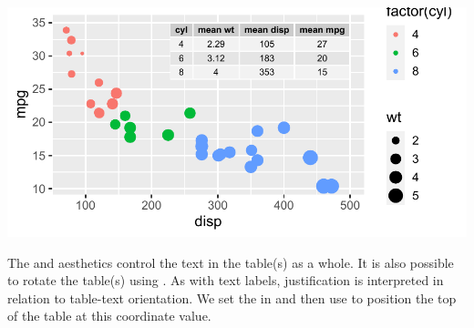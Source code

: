 \documentclass[krantz2]{krantz}\usepackage{knitr}
\begin{document}
\begin{knitrout}\footnotesize
{}\color{fgcolor}\begin{kframe}
\begin{alltt}
\hlstd{(}  \hlstd{(}   
                           \hlstd{=} 
                           
                            \hlopt{+}
  \hlstd{()} \hlopt{+}
  \hlstd{()} \hlopt{+}
  \hlstd{(} 
             \hlstd{(}     
              \hlstd{=} \hlstd{,}  \hlstd{=} \hlstd{)}
\end{alltt}
\end{kframe}

{\centering \includegraphics[width=.7\textwidth]{figure/pos-table-plot-02-1} 

}



\end{knitrout}

The  and  aesthetics control the text in the table(s) as a whole.
It is also possible to rotate the table(s) using . As with text labels, justification is interpreted in relation to table-text orientation. We set the  in  and then use  to position the top of the table at this coordinate value.

\begin{knitrout}\footnotesize
{}\color{fgcolor}\begin{kframe}
\begin{alltt}
\hlstd{(}  \hlstd{(}     \hlstd{=}  \hlopt{+}
  \hlstd{()} \hlopt{+}
  \hlstd{(} 
             \hlstd{(}     
              \hlstd{=} \hlstd{,}  \hlstd{=} \hlstd{,}
              \hlstd{=} \hlstd{,}  \hlstd{=} \hlstd{,}  \hlstd{=} \hlstd{)}
\end{alltt}
\end{kframe}
\end{knitrout}
\end{document}
